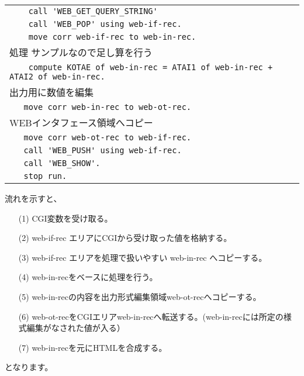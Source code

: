 {\begin{tabular}{|l|}
\verb+    call 'WEB_GET_QUERY_STRING'+\\
\verb+    call 'WEB_POP' using web-if-rec.+\\
\verb+    move corr web-if-rec to web-in-rec.+\\
  処理 サンプルなので足し算を行う\\
\verb$    compute KOTAE of web-in-rec = ATAI1 of web-in-rec + ATAI2 of web-in-rec.$\\
  出力用に数値を編集\\
\verb+   move corr web-in-rec to web-ot-rec.+\\
WEBインタフェース領域へコピー\\
\verb+   move corr web-ot-rec to web-if-rec.+\\
\verb+   call 'WEB_PUSH' using web-if-rec.+\\
\verb+   call 'WEB_SHOW'.+\\
\verb+   stop run.+\\
\hline
\end{tabular}
}

流れを示すと、

{\small

\begin{itemize}

\item[(1)]{CGI変数を受け取る。}
\item[(2)]{web-if-rec エリアにCGIから受け取った値を格納する。}
\item[(3)]{web-if-rec エリアを処理で扱いやすい web-in-rec へコピーする。}
\item[(4)]{web-in-recをベースに処理を行う。}
\item[(5)]{web-in-recの内容を出力形式編集領域web-ot-recへコピーする。}
\item[(6)]{web-ot-recをCGIエリアweb-in-recへ転送する。(web-in-recには所定の様式編集がなされた値が入る）}
\item[(7)]{web-in-recを元にHTMLを合成する。}
\end{itemize}
}

となります。
